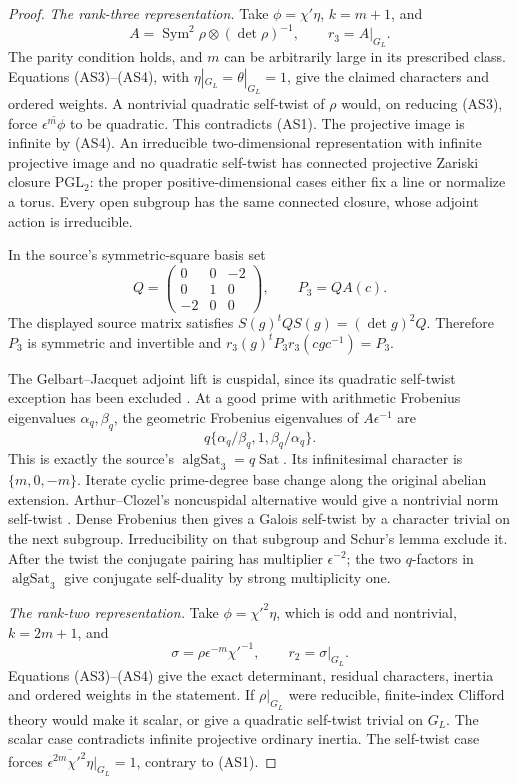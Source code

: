 \begin{proof}
\emph{The rank-three representation.}
Take \(\phi=\chi'\eta\), \(k=m+1\), and
\[
 A=\operatorname{Sym}^2\rho\otimes(\det\rho)^{-1},
 \qquad r_3=A|_{G_L}.
\]
The parity condition holds, and \(m\) can be arbitrarily large
in its prescribed class.  Equations (AS3)--(AS4), with
\(\eta|_{G_L}=\theta|_{G_L}=1\), give the claimed characters
and ordered weights.  A nontrivial quadratic self-twist of \(\rho\)
would, on reducing (AS3), force
\(\overline{\epsilon^m\phi}\) to be quadratic.  This contradicts
(AS1).  The projective image is infinite by (AS4).
An irreducible two-dimensional representation with infinite projective
image and no quadratic self-twist has connected projective Zariski
closure \(\mathrm{PGL}_2\): the proper positive-dimensional cases
either fix a line or normalize a torus.  Every open subgroup has the
same connected closure, whose adjoint action is irreducible.

In the source's symmetric-square basis set
\[
 Q=\begin{pmatrix}0&0&-2\\0&1&0\\-2&0&0\end{pmatrix},
 \qquad P_3=QA(c).
\]
The displayed source matrix satisfies
\(S(g)^tQS(g)=(\det g)^2Q\).  Therefore \(P_3\) is symmetric
and invertible and
\(r_3(g)^tP_3r_3(cgc^{-1})=P_3\).

The Gelbart--Jacquet adjoint lift is cuspidal, since its quadratic
self-twist exception has been excluded
\cite[Theorem 9.3]{SeedGelbartJacquet}.
At a good prime with arithmetic Frobenius eigenvalues
\(\alpha_q,\beta_q\), the geometric Frobenius eigenvalues of
\(A\epsilon^{-1}\) are
\[
              q\{\alpha_q/\beta_q,1,\beta_q/\alpha_q\}.
\]
This is exactly the source's \(\operatorname{algSat}_3=q\operatorname{Sat}\).
Its infinitesimal character is \(\{m,0,-m\}\).
Iterate cyclic prime-degree base change along the original abelian
extension.  Arthur--Clozel's noncuspidal alternative would give a
nontrivial norm self-twist \cite[III.4.2 and III.5.1]{SeedArthurClozel}.
Dense Frobenius then gives a Galois self-twist by a character trivial
on the next subgroup.  Irreducibility on that subgroup and Schur's
lemma exclude it.  After the twist the conjugate pairing has multiplier
\(\epsilon^{-2}\); the two \(q\)-factors in
\(\operatorname{algSat}_3\) give conjugate self-duality by strong
multiplicity one.

\emph{The rank-two representation.}
Take \(\phi=\chi'^2\eta\), which is odd and nontrivial,
\(k=2m+1\), and
\[
            \sigma=\rho\epsilon^{-m}\chi'^{-1},
            \qquad r_2=\sigma|_{G_L}.
\]
Equations (AS3)--(AS4) give the exact determinant, residual characters,
inertia and ordered weights in the statement.
If \(\rho|_{G_L}\) were reducible, finite-index Clifford theory
would make it scalar, or give a quadratic self-twist trivial on
\(G_L\).  The scalar case contradicts infinite projective ordinary
inertia.  The self-twist case forces
\(\overline{\epsilon^{2m}\chi'^2\eta}|_{G_L}=1\), contrary
to (AS1).


\end{proof}
